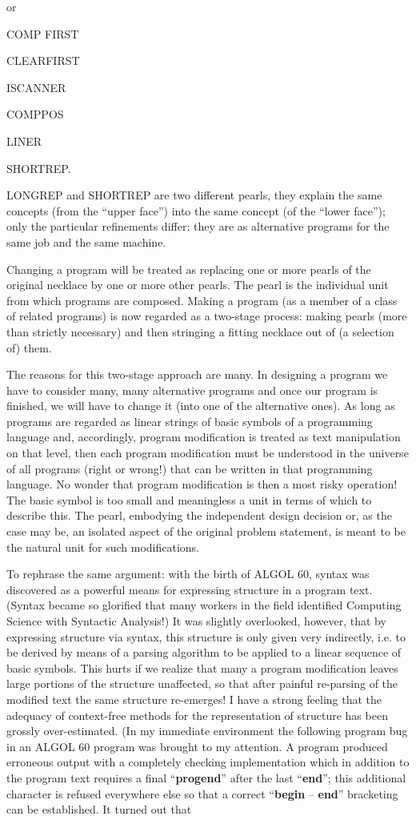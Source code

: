 \noindent
or

COMP FIRST

CLEARFIRST

ISCANNER

COMPPOS

LINER

SHORTREP.

LONGREP and SHORTREP are two different pearls, they explain the same concepts (from the ``upper face'') into the same concept (of the ``lower face''); only the particular refinements differ: they are as alternative programs for the same job and the same machine.

Changing a program will be treated as replacing one or more pearls of the original necklace by one or more other pearls. The pearl is the individual unit from which programs are composed. Making a program (as a member of a class of related programs) is now regarded as a two-stage process: making pearls (more than strictly necessary) and then stringing a fitting necklace out of (a selection of) them.

The reasons for this two-stage approach are many. In designing a program we have to consider many, many alternative programs and once our program is finished, we will have to change it (into one of the alternative ones). As long as programs are regarded as linear strings of basic symbols of a programming language and, accordingly, program modification is treated as text manipulation on that level, then each program modification must be understood in the universe of all programs (right or wrong!) that can be written in that programming language. No wonder that program modification is then a most risky operation! The basic symbol is too small and meaningless a unit in terms of which to describe this. The pearl, embodying the independent design decision or, as the case may be, an isolated aspect of the original problem statement, is meant to be the natural unit for such modifications.

To rephrase the same argument: with the birth of ALGOL 60, syntax was discovered as a powerful means for expressing structure in a program text. (Syntax became so glorified that many workers in the field identified Computing Science with Syntactic Analysis!) It was slightly overlooked, however, that by expressing structure via syntax, this structure is only given very indirectly, i.e. to be derived by means of a parsing algorithm to be applied to a linear sequence of basic symbols. This hurts if we realize that many a program modification leaves large portions of the structure unaffected, so that after painful re-parsing of the modified text the same structure re-emerges! I have a strong feeling that the adequacy of context-free methods for the representation of structure has been grossly over-estimated. (In my immediate environment the following program bug in an ALGOL 60 program was brought to my attention. A program produced erroneous output with a completely checking implementation which in addition to the program text requires a final ``\textbf{progend}'' after the last ``\textbf{end}''; this additional character is refused everywhere else so that a correct ``\textbf{begin} -- \textbf{end}'' bracketing can be established. It turned out that

